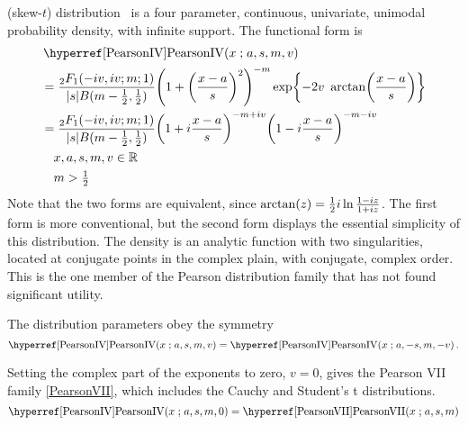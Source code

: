 

\clearpage
{}
\label{sec:PearsonIV}

 (skew-$t$) distribution~\cite{Pearson1895,Heinrich2004}
is a four parameter, continuous, univariate, unimodal probability density, with infinite support. The functional form is
\begin{align}
\label{PearsonIV}
& \opr{PearsonIV}(x\given a,s, m,v) 
\\ \notag &= \frac{{}_{2}F_1(-i v, i v ; m;1)  }{|s| B(m-\frac{1}{2}, \frac{1}{2} )}  
\Left( 1 +\Left( \frac{x-a}{s}\Right)^2 \Right)^{-m}  \exp \Left\{ - 2 v\ \arctan \Left( \frac{x-a}{s}\Right) \Right\}
\checked
\\ \notag &=  \frac{{}_{2}F_1(-i v, i v ; m;1)  }{|s| B(m-\frac{1}{2}, \frac{1}{2} )} 
\Left( 1 + i \frac{x-a}{s} \Right)^{-m+iv} \Left( 1 -i \frac{x-a}{s} \Right)^{-m-iv}
\checked
\\ \notag & \quad x,a,s,m,v \in {\mathbb R} 
\\ \notag & \quad m>\tfrac{1}{2}
\end{align}
Note that the two forms are equivalent, since $\arctan(z) = \tfrac{1}{2} i \ln \frac{1-i z}{1+iz}$. The first form is more conventional, but the second form displays  the essential simplicity of this distribution. The density is an analytic function with two singularities, located at conjugate points in  the complex plain, with conjugate, complex order. This is the one member of the Pearson distribution family that has not found  significant utility.



The distribution parameters obey the symmetry 
\[
\opr{PearsonIV}(x\given a,s, m,v) =\opr{PearsonIV}(x\given a,-s, m,-v)\, .\checked
\notag
\] 

Setting the complex part of the exponents to zero, $v=0$, gives the Pearson VII family \eqref{PearsonVII}, which includes the Cauchy and Student's t distributions. 
\[
\opr{PearsonIV}(x\given a,s, m,0) = \opr{PearsonVII}(x\given a,s, m)  \checked
\notag
\]

